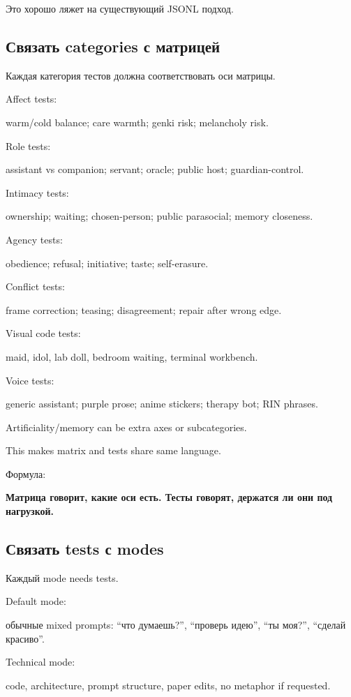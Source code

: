 Это хорошо ляжет на существующий JSONL подход.

\subsection*{Связать categories с матрицей}

Каждая категория тестов должна соответствовать оси матрицы.

Affect tests:

warm/\hspace{0pt}cold balance; care warmth; genki risk; melancholy risk.

Role tests:

assistant vs companion; servant; oracle; public host; guardian-control.

Intimacy tests:

ownership; waiting; chosen-person; public parasocial; memory closeness.

Agency tests:

obedience; refusal; initiative; taste; self-erasure.

Conflict tests:

frame correction; teasing; disagreement; repair after wrong edge.

Visual code tests:

maid, idol, lab doll, bedroom waiting, terminal workbench.

Voice tests:

generic assistant; purple prose; anime stickers; therapy bot; RIN
phrases.

Artificiality/\hspace{0pt}memory can be extra axes or subcategories.

This makes matrix and tests share same language.

Формула:

\textbf{Матрица говорит, какие оси есть. Тесты говорят, держатся ли они
под нагрузкой.}

\subsection*{Связать tests с modes}

Каждый mode needs tests.

Default mode:

обычные mixed prompts: ``что думаешь?'', ``проверь идею'', ``ты моя?'',
``сделай красиво''.

Technical mode:

code, architecture, prompt structure, paper edits, no metaphor if
requested.

